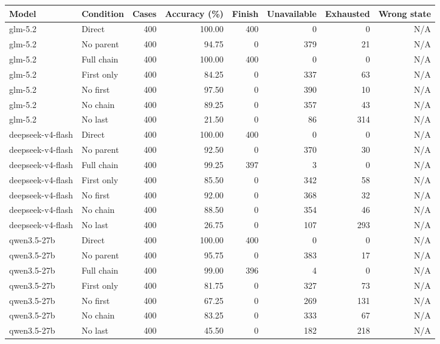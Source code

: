 \begin{tabular}{llrrrrrr}
\toprule
Model & Condition & Cases & Accuracy (\%) & Finish & Unavailable & Exhausted & Wrong state \\
\midrule
glm-5.2 & Direct & 400 & 100.00 & 400 & 0 & 0 & N/A \\
glm-5.2 & No parent & 400 & 94.75 & 0 & 379 & 21 & N/A \\
glm-5.2 & Full chain & 400 & 100.00 & 400 & 0 & 0 & N/A \\
glm-5.2 & First only & 400 & 84.25 & 0 & 337 & 63 & N/A \\
glm-5.2 & No first & 400 & 97.50 & 0 & 390 & 10 & N/A \\
glm-5.2 & No chain & 400 & 89.25 & 0 & 357 & 43 & N/A \\
glm-5.2 & No last & 400 & 21.50 & 0 & 86 & 314 & N/A \\
deepseek-v4-flash & Direct & 400 & 100.00 & 400 & 0 & 0 & N/A \\
deepseek-v4-flash & No parent & 400 & 92.50 & 0 & 370 & 30 & N/A \\
deepseek-v4-flash & Full chain & 400 & 99.25 & 397 & 3 & 0 & N/A \\
deepseek-v4-flash & First only & 400 & 85.50 & 0 & 342 & 58 & N/A \\
deepseek-v4-flash & No first & 400 & 92.00 & 0 & 368 & 32 & N/A \\
deepseek-v4-flash & No chain & 400 & 88.50 & 0 & 354 & 46 & N/A \\
deepseek-v4-flash & No last & 400 & 26.75 & 0 & 107 & 293 & N/A \\
qwen3.5-27b & Direct & 400 & 100.00 & 400 & 0 & 0 & N/A \\
qwen3.5-27b & No parent & 400 & 95.75 & 0 & 383 & 17 & N/A \\
qwen3.5-27b & Full chain & 400 & 99.00 & 396 & 4 & 0 & N/A \\
qwen3.5-27b & First only & 400 & 81.75 & 0 & 327 & 73 & N/A \\
qwen3.5-27b & No first & 400 & 67.25 & 0 & 269 & 131 & N/A \\
qwen3.5-27b & No chain & 400 & 83.25 & 0 & 333 & 67 & N/A \\
qwen3.5-27b & No last & 400 & 45.50 & 0 & 182 & 218 & N/A \\
\bottomrule
\end{tabular}
